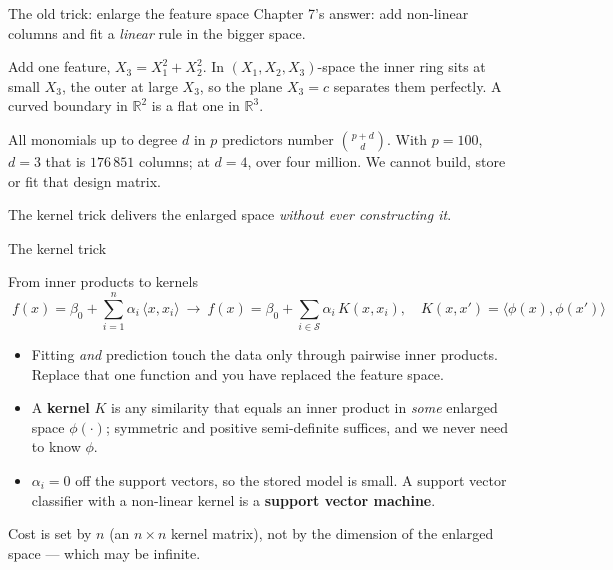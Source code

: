 \documentclass[aspectratio=169,11pt]{beamer}
\begin{document}
\begin{frame}{The old trick: enlarge the feature space}
  \footnotesize
  Chapter 7's answer: add non-linear columns and fit a \emph{linear} rule in
  the bigger space.
  \begin{numexample}
    Add one feature, $X_3 = X_1^2 + X_2^2$. In $(X_1,X_2,X_3)$-space the inner
    ring sits at small $X_3$, the outer at large $X_3$, so the plane $X_3 = c$
    separates them perfectly. A curved boundary in $\mathbb{R}^2$ is a flat one
    in $\mathbb{R}^3$.
  \end{numexample}
  \begin{readme}
    All monomials up to degree $d$ in $p$ predictors number
    $\binom{p+d}{d}$. With $p=100$, $d=3$ that is $176\,851$ columns; at $d=4$,
    over four million. We cannot build, store or fit that design matrix.
  \end{readme}
  \begin{takeaway}
    The kernel trick delivers the enlarged space \emph{without ever
    constructing it}.
  \end{takeaway}
\end{frame}

\begin{frame}{The kernel trick}
  \scriptsize
  \begin{block}{From inner products to kernels}
    \[
      \boxed{\;
      f(x) = \beta_0 + \sum_{i=1}^{n}\alpha_i\,\langle x, x_i\rangle
      \ \longrightarrow\
      f(x) = \beta_0 + \sum_{i\in\mathcal S}\alpha_i\, K(x, x_i),
      \quad K(x,x') = \langle \phi(x), \phi(x')\rangle \;}
    \]
  \end{block}
  \begin{readme}
    \begin{itemize}
      \item Fitting \emph{and} prediction touch the data only through pairwise
            inner products. Replace that one function and you have replaced the
            feature space.
      \item A \textbf{kernel} $K$ is any similarity that equals an inner
            product in \emph{some} enlarged space $\phi(\cdot)$; symmetric and
            positive semi-definite suffices, and we never need to know $\phi$.
      \item $\alpha_i = 0$ off the support vectors, so the stored model is
            small. A support vector classifier with a non-linear kernel is a
            \textbf{support vector machine}.
    \end{itemize}
  \end{readme}
  \begin{takeaway}
    Cost is set by $n$ (an $n\times n$ kernel matrix), not by the dimension of
    the enlarged space --- which may be infinite.
  \end{takeaway}
\end{frame}
\end{document}
